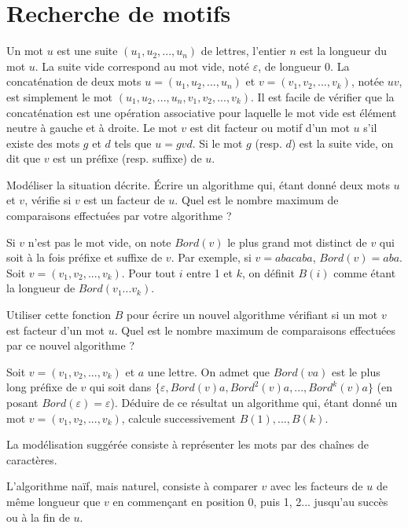\renewcommand{\SourceFile}{2-jouer-avec-les-mots/src/2-4.ml}

\section{Recherche de motifs}

Un mot $u$ est une suite $(u_1, u_2, ..., u_n)$ de lettres, l'entier $n$ est la longueur du mot $u$. La suite vide correspond au mot vide, noté $\varepsilon$, de longueur 0. La concaténation de deux mots $u=(u_1, u_2, ..., u_n)$ et $v=(v_1, v_2, ..., v_k)$, notée $uv$, est simplement le mot $(u_1, u_2, ..., u_n, v_1, v_2, ..., v_k)$. Il est facile de vérifier que la concaténation est une opération associative pour laquelle le mot vide est élément neutre à gauche et à droite. Le mot $v$ est dit facteur ou motif d'un mot $u$ s'il existe des mots $g$ et $d$ tels que $u=gvd$. Si le mot $g$ (resp. $d$) est la suite vide, on dit que $v$ est un préfixe (resp. suffixe) de $u$.

\Q
Modéliser la situation décrite. Écrire un algorithme qui, étant donné deux mots $u$ et $v$, vérifie si $v$ est un facteur de $u$. Quel est le nombre maximum de comparaisons effectuées par votre algorithme ?

\Q
Si $v$ n'est pas le mot vide, on note $Bord(v)$ le plus grand mot distinct de $v$ qui soit à la fois préfixe et suffixe de $v$. Par exemple, si $v=abacaba$, $Bord(v)=aba$. Soit $v=(v_1, v_2, ..., v_k)$. Pour tout $i$ entre 1 et $k$, on définit $B(i)$ comme étant la longueur de $Bord(v_1 ... v_k)$.
\smallskip

Utiliser cette fonction $B$ pour écrire un nouvel algorithme vérifiant si un mot $v$ est facteur d'un mot $u$. Quel est le nombre maximum de comparaisons effectuées par ce nouvel algorithme ?

\Q
Soit $v=(v_1, v_2, ..., v_k)$ et $a$ une lettre. On admet que $Bord(va)$ est le plus long préfixe de $v$ qui soit dans $\{\varepsilon, Bord(v)a,Bord^2(v)a, ..., Bord^k(v)a\}$ (en posant $Bord(\varepsilon)=\varepsilon$). Déduire de ce résultat un algorithme qui, étant donné un mot $v=(v_1, v_2, ..., v_k)$, calcule successivement $B(1), ..., B(k)$.

\newpage

\Corrige

\Q
La modélisation suggérée consiste à représenter les mots par des chaînes de caractères.
\medskip

L'algorithme naïf, mais naturel, consiste à comparer $v$ avec les facteurs de $u$ de même longueur que $v$ en commençant en position 0, puis 1, 2... jusqu'au succès ou à la fin de $u$.

